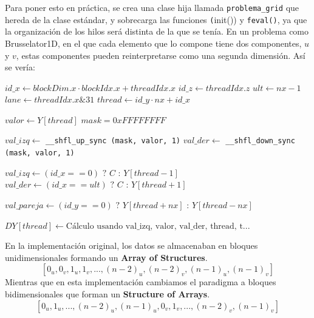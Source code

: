 Para poner esto en práctica, se crea una clase hija llamada \texttt{problema\_grid} que hereda de la clase estándar, y sobrecarga las funciones \texttt(init()) y \texttt{feval()}, ya que la organización de los hilos será distinta de la que se tenía. En un problema como Brusselator1D, en el que cada elemento que lo compone tiene dos componentes, $u$ y $v$, estas componentes pueden reinterpretarse como una segunda dimensión. Así se vería:

\begin{algorithm}[H]
	\begin{algorithmic}
		\State $id\_x \gets blockDim.x \cdot blockIdx.x + threadIdx.x$ 
		\State $id\_z \gets threadIdx.z$ 
		\State $ult \gets nx - 1$
		\State $lane \gets threadIdx.x \& 31$ 
		\State $thread \gets id\_y \cdot nx + id\_x$
		
			\State $valor \gets Y[thread]$ 
			\State $mask = 0xFFFFFFFF$
			
			\State $val\_izq \gets$ \verb|__shfl_up_sync (mask, valor, 1)| 
			\State $val\_der \gets$ \verb|__shfl_down_sync (mask, valor, 1)|
			
			 
				\State $val\_izq \gets (id\_x==0)\text{ ? } C \text{ : } Y[thread-1]$ 
			\EndIf
				\State $val\_der \gets (id\_x==ult)\text{ ? } C \text{ : } Y[thread+1]$ 
			\EndIf
			
			\State $ val\_pareja \gets (id\_y==0) \text{ ? } Y[thread+nx] \text{ : } Y[thread-nx] $
			
			\State $DY[thread] \gets \text{Cálculo usando val\_izq, valor, val\_der, thread, t...}$
		\EndIf
	\end{algorithmic}
	\caption{Kernel feval de Brusselator1D con grid multidimensional}
	\label{alg:Grid-Brusselator1D}
\end{algorithm}

En la implementación original, los datos se almacenaban en bloques unidimensionales formando un \textbf{Array of Structures}.
\begin{equation}
	\label{eq:ArrayOfStructures}
	[0_u, 0_v, 1_u, 1_v, ..., (n-2)_u, (n-2)_v, (n-1)_u, (n-1)_v]
\end{equation}
Mientras que en esta implementación cambiamos el paradigma a bloques bidimensionales que forman un \textbf{Structure of Arrays}.
\begin{equation}
	\label{eq:StructureOfArrays}
	[0_u, 1_u, ..., (n-2)_u, (n-1)_u, 0_v, 1_v, ..., (n-2)_v, (n-1)_v]
\end{equation}

